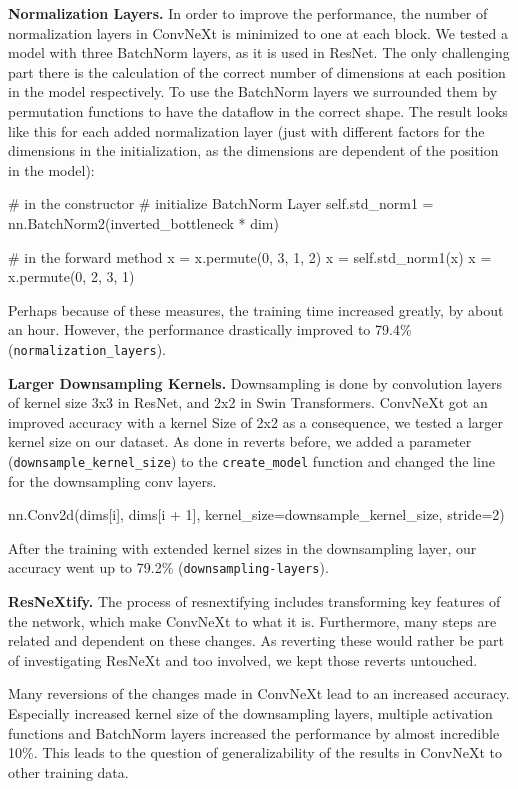 \documentclass{article}
\begin{document}
\textbf{Normalization Layers.}
In order to improve the performance, the number of normalization layers in ConvNeXt is minimized to one at each block.
We tested a model with three BatchNorm layers, as it is used in ResNet.
The only challenging part there is the calculation of the correct number of dimensions at each position in the model respectively.
To use the BatchNorm layers we surrounded them by permutation functions to have the dataflow in the correct shape.
The result looks like this for each added normalization layer (just with different factors for the dimensions in the initialization, as the dimensions are dependent of the position in the model):
\begin{python}
# in the constructor
# initialize BatchNorm Layer
self.std_norm1 = nn.BatchNorm2(inverted_bottleneck * dim)

# in the forward method
x = x.permute(0, 3, 1, 2)
x = self.std_norm1(x)
x = x.permute(0, 2, 3, 1)
\end{python}
Perhaps because of these measures, the training time increased greatly, by about an hour.
However, the performance drastically improved to 79.4\% (\texttt{normalization\_layers}).

\textbf{Larger Downsampling Kernels.}
Downsampling is done by convolution layers of kernel size 3x3 in ResNet, and 2x2 in Swin Transformers.
ConvNeXt got an improved accuracy with a kernel Size of 2x2 as a consequence, we tested a larger kernel size on our dataset.
As done in reverts before, we added a parameter (\texttt{downsample\_kernel\_size}) to the \texttt{create\_model} function and changed the line for the downsampling conv layers.
\begin{python}
nn.Conv2d(dims[i], dims[i + 1],
        kernel_size=downsample_kernel_size, stride=2)
\end{python}
After the training with extended kernel sizes in the downsampling layer, our accuracy went up to 79.2\% (\texttt{downsampling-layers}).

\textbf{ResNeXtify.}
The process of resnextifying includes transforming key features of the network, which make ConvNeXt to what it is.
Furthermore, many steps are related and dependent on these changes.
As reverting these would rather be part of investigating ResNeXt and too involved, we kept those reverts untouched.

Many reversions of the changes made in ConvNeXt lead to an increased accuracy.
Especially increased kernel size of the downsampling layers, multiple activation functions and BatchNorm layers increased the performance by almost incredible 10\%.
This leads to the question of generalizability of the results in ConvNeXt to other training data.
\end{document}
